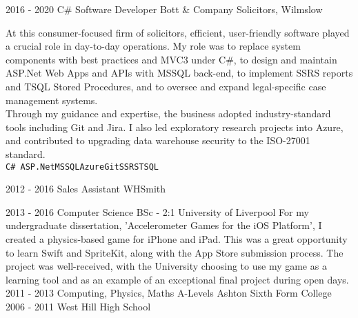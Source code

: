 \documentclass[8pt]{developercv} %
\begin{document}
\begin{entrylist}
\vspace{0.6cm}
    \entry
		{2016 - 2020}
		{C\# Software Developer}
		{Bott \& Company Solicitors, Wilmslow}
		{\raggedright At this consumer-focused firm of solicitors, efficient, user-friendly software played a crucial role in day-to-day operations. My role was to replace system components with best practices and MVC3 under C\#, to design and maintain ASP.Net Web Apps and APIs with MSSQL back-end, to implement SSRS reports and TSQL Stored Procedures, and to oversee and expand legal-specific case management systems.\\\vspace{0.1cm}Through my guidance and expertise, the business adopted industry-standard tools including Git and Jira. I also led exploratory research projects into Azure, and contributed to upgrading data warehouse security to the ISO-27001 standard.\\\vspace{0.1cm}\texttt{C\# ASP.Net}\slashsep\texttt{MSSQL}\slashsep\texttt{Azure}\slashsep\texttt{Git}\slashsep\texttt{SSRS}\slashsep\texttt{TSQL}}

\vspace{0.6cm}
    \entry
		{2012 - 2016}
		{Sales Assistant}
		{WHSmith}
		{\raggedright }
\end{entrylist}



\begin{entrylist}
	\entry
		{2013 - 2016}
		{Computer Science BSc - 2:1}
		{University of Liverpool}
		{For my undergraduate dissertation, 'Accelerometer Games for the iOS Platform', I created a physics-based game for iPhone and iPad. This was a great opportunity to learn Swift and SpriteKit, along with the App Store submission process. The project was well-received, with the University choosing to use my game as a learning tool and as an example of an exceptional final project during open days.}
	\entry
		{2011 - 2013}
		{Computing, Physics, Maths A-Levels}
		{Ashton Sixth Form College}
		{}
	\entry
		{2006 - 2011}
		{}
		{West Hill High School}
		{}
\end{entrylist}
\end{document}
